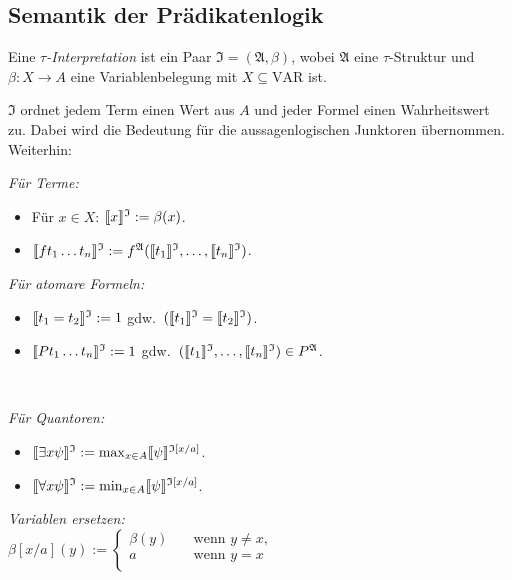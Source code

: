 \documentclass[a4paper,parskip=half*,DIV=15,fontsize=11pt]{scrartcl}
\DeclarePairedDelimiter\interpret{\llbracket}{\rrbracket}
\newcommand{\J}{\mathfrak{I}}
\newcommand{\A}{\mathfrak{A}}
\newcommand{\VAR}{\mathrm{VAR}}
\begin{document}
\subsection{Semantik der Prädikatenlogik}

Eine \emph{$\tau$-Interpretation} ist ein Paar $\J = (\A, \beta)$, wobei $\A$ eine $\tau$-Struktur und $\beta : X \to A$ eine Variablenbelegung mit $X \subseteq \VAR$ ist.

$\J$ ordnet jedem Term einen Wert aus $A$ und jeder Formel einen Wahrheitswert zu. Dabei wird die Bedeutung für die aussagenlogischen Junktoren übernommen. Weiterhin:

\begin{minipage}[t]{0.45\textwidth}
\emph{Für Terme:}
\begin{itemize}
    \itemsep0em
    \item Für $x \in X$: $\interpret{x}^\J := \beta(x)$.
    \item $\interpret{f t_1 \ldots t_n}^\J := f^\A(\interpret{t_1}^\J, \ldots, \interpret{t_n}^\J)$.
\end{itemize}
\end{minipage}
\begin{minipage}[t]{0.55\textwidth}
\emph{Für atomare Formeln:}
\begin{itemize}
    \itemsep0em
    \item $\interpret{t_1 = t_2}^\J := 1 $ gdw.\ $(\interpret{t_1}^\J = \interpret{t_2}^\J)$.
    \item $\interpret{P t_1 \ldots t_n}^\J := 1$ gdw.\ $(\interpret{t_1}^\J, \ldots, \interpret{t_n}^\J) \in P^\A$.
\end{itemize}
\end{minipage}
\bigskip \\
\begin{minipage}[t]{0.45\textwidth}
\emph{Für Quantoren:}
\begin{itemize}
    \itemsep0em
    \item $\interpret{\exists x \psi}^\J := \max_{x \in A} \interpret{\psi}^{\J [x/a]}$.
    \item $\interpret{\forall x \psi}^\J := \min_{x \in A} \interpret{\psi}^{\J [x/a]}$.
\end{itemize}
\end{minipage}
\begin{minipage}[t]{0.55\textwidth}
\emph{Variablen ersetzen:}
\vspace{2ex} \\
$\beta[x/a](y) :=  \begin{cases}
       \beta(y) &\quad\text{wenn } y \neq x, \\
       a &\quad\text{wenn } y = x \\
     \end{cases}$
\end{minipage}
\medskip
\end{document}
